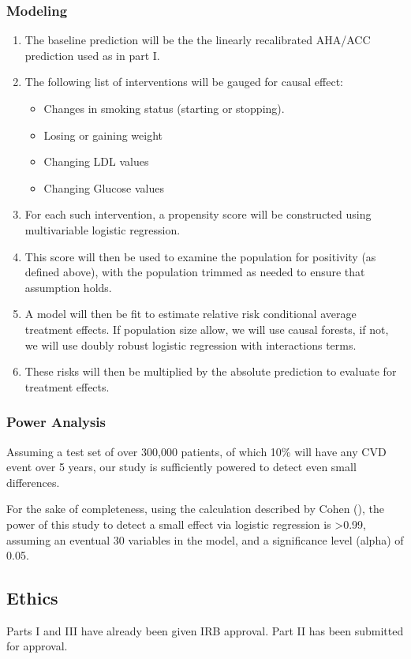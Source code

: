 \documentclass[a4paper,12pt]{article}
\begin{document}
		\subsubsection*{Modeling}
		\begin{enumerate}
			\item The baseline prediction will be the the linearly recalibrated AHA/ACC prediction used as in part I.
			\item The following list of interventions will be gauged for causal effect:
			\begin{itemize}
				\item Changes in smoking status (starting or stopping).
				\item Losing or gaining weight
				\item Changing LDL values
				\item Changing Glucose values
			\end{itemize}
			\item For each such intervention, a propensity score will be constructed using multivariable logistic regression.
			\item This score will then be used to examine the population for positivity (as defined above), with the population trimmed as needed to ensure that assumption holds.
			\item A model will then be fit to estimate relative risk conditional average treatment effects. If population size allow, we will use causal forests, if not, we will use doubly robust\cite{GuidoWImbens2015} logistic regression with interactions terms.
			\item These risks will then be multiplied by the absolute prediction to evaluate for treatment effects.
		\end{enumerate}
		
		\subsubsection*{Power Analysis}
		Assuming a test set of over 300,000 patients, of which 10\% will have any CVD event over 5 years, our study is sufficiently powered to detect even small differences.
		
		For the sake of completeness, using the calculation described by Cohen (\cite{Cohen1988}), the power of this study to detect a small effect via logistic regression is >0.99, assuming an eventual 30 variables in the model, and a significance level (alpha) of 0.05.
		
		\subsection{Ethics}
		Parts I and III have already been given IRB approval. Part II has been submitted for approval.
	
\end{document}

